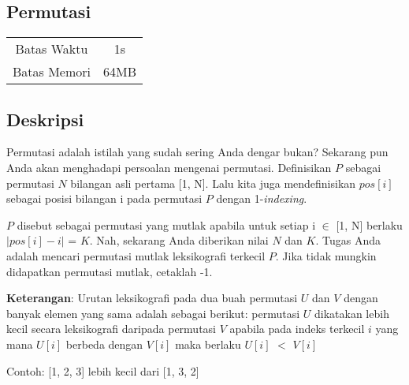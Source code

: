 \documentclass{article}
\begin{document}
\begin{center}
    \section*{Permutasi} %

    \begin{tabular}{ | c c | }
        \hline
        Batas Waktu  & 1s \\    %
        Batas Memori & 64MB \\  %
        \hline
    \end{tabular}
\end{center}

\subsection*{Deskripsi}



Permutasi adalah istilah yang sudah sering Anda dengar bukan? Sekarang pun Anda akan menghadapi persoalan mengenai permutasi.
Definisikan $P$ sebagai permutasi $N$ bilangan asli pertama [1, N]. Lalu kita juga mendefinisikan $pos[i]$ sebagai posisi bilangan i
pada permutasi $P$ dengan 1-\textit{indexing}.

$P$ disebut sebagai permutasi yang mutlak apabila untuk setiap i $\in$ [1, N] berlaku \(\lvert {pos[i]-i}\rvert\) = $K$. Nah, sekarang Anda diberikan nilai $N$ dan 
$K$. Tugas Anda adalah mencari permutasi mutlak leksikografi terkecil $P$. Jika tidak mungkin didapatkan permutasi mutlak, cetaklah -1.

\textbf{Keterangan}:
Urutan leksikografi pada dua buah permutasi $U$ dan $V$ dengan banyak elemen yang sama adalah sebagai berikut: permutasi $U$ dikatakan lebih kecil secara
leksikografi daripada permutasi $V$ apabila pada indeks terkecil $i$ yang mana $U[i]$ berbeda 
dengan $V[i]$ maka berlaku $U[i]$ $<$ $V[i]$

Contoh: 
[1, 2, 3] lebih kecil dari [1, 3, 2]

\end{document}
